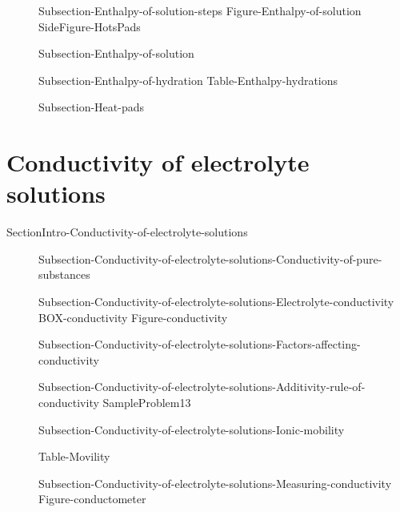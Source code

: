 \documentclass[main.tex]{subfiles}
\begin{document}
\sloppy \begin{description}


\item[] {Subsection-Enthalpy-of-solution-steps}
{Figure-Enthalpy-of-solution}
{SideFigure-HotsPads}

\item[] {Subsection-Enthalpy-of-solution}
\item[] {Subsection-Enthalpy-of-hydration}
{Table-Enthalpy-hydrations}
\item[] {Subsection-Heat-pads}
\end{description}



\section{Conductivity of electrolyte solutions}{SectionIntro-Conductivity-of-electrolyte-solutions}
\sloppy \begin{description}
\item[] {Subsection-Conductivity-of-electrolyte-solutions-Conductivity-of-pure-substances}
\item[] {Subsection-Conductivity-of-electrolyte-solutions-Electrolyte-conductivity}
{BOX-conductivity}
{Figure-conductivity}   
\item[] {Subsection-Conductivity-of-electrolyte-solutions-Factors-affecting-conductivity}
\item[] {Subsection-Conductivity-of-electrolyte-solutions-Additivity-rule-of-conductivity}
{SampleProblem13}
\item[] {Subsection-Conductivity-of-electrolyte-solutions-Ionic-mobility}
 \begin{center}{Table-Movility} \end{center}
\item[] {Subsection-Conductivity-of-electrolyte-solutions-Measuring-conductivity}
\renewcommand\chapterpathtoimages{../}{Figure-conductometer}   

\end{description}




\checkoddpage\ifoddpage \clearpage\thispagestyle{empty}\mbox{}\clearpage \else  \fi 
\end{document}
